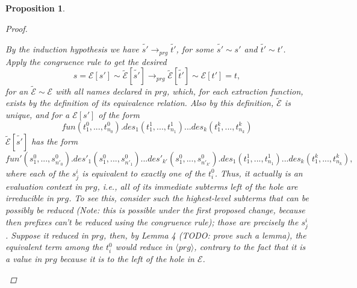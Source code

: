 \documentclass[11pt]{article} %
\newtheorem{proposition}{Proposition}
\begin{document}
\begin{proposition}
\begin{proof}
\begin{enumerate}
By the induction hypothesis we have $\widetilde{s'} \longrightarrow_{prg} \widetilde{t'}$, for some $\widetilde{s'} \sim s'$ and $\widetilde{t'} \sim t'$. Apply the congruence rule to get the desired
\begin{equation*}
s = \mathcal{E}[s'] \sim \widetilde{\mathcal{E}}[\widetilde{s'}] \longrightarrow_{prg} \widetilde{\mathcal{E}}[\widetilde{t'}] \sim \mathcal{E}[t'] = t,
\end{equation*}
for an $\widetilde{\mathcal{E}} \sim \mathcal{E}$ with all names declared in $prg$, which, for each extraction function, exists by the definition of its equivalence relation. Also by this definition, $\widetilde{\mathcal{E}}$ is unique, and for a $\mathcal{E}[s']$ of the form
\begin{equation*}
fun(t^0_1, ..., t^0_{n_0}).des_1(t^1_1, ..., t^1_{n_1})...des_k(t^k_1, ..., t^k_{n_k})
\end{equation*}
$\widetilde{\mathcal{E}}[\widetilde{s'}]$ has the form
\begin{equation*}
fun'(s^0_1, ..., s^0_{n'_0}).des'_1(s^0_1, ..., s^0_{n'_1})...des'_{k'}(s^0_1, ..., s^0_{n'_{k'}}).des_1(t^1_1, ..., t^1_{n_1})...des_k(t^k_1, ..., t^k_{n_k}),
\end{equation*}
where each of the $s^i_j$ is equivalent to exactly one of the $t^0_i$. Thus, it actually is an evaluation context in $prg$, i.e., all of its immediate subterms left of the hole are irreducible in $prg$. To see this, consider such the highest-level subterms that can be possibly be reduced (Note: this is possible under the first proposed change, because then prefixes can't be reduced using the congruence rule); those are precisely the $s^i_j$. Suppose it reduced in $prg$, then, by Lemma 4 (TODO: prove such a lemma), the equivalent term among the $t^0_i$ would reduce in $\langle prg \rangle$, contrary to the fact that it is a value in $prg$ because it is to the left of the hole in $\mathcal{E}$.

\end{enumerate}

\end{proof}

\end{proposition}

\end{document}
